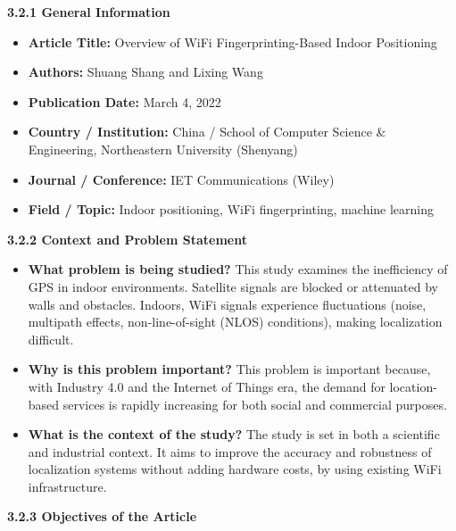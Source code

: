 \documentclass{ipgpmaster}
\begin{document}
\textbf{3.2.1   General Information}

\begin{itemize}
    \item \textbf{Article Title:} Overview of WiFi Fingerprinting-Based Indoor Positioning 
    \item \textbf{Authors:} Shuang Shang and Lixing Wang 
    \item \textbf{Publication Date:} March 4, 2022 
    \item \textbf{Country / Institution:} China / School of Computer Science \& Engineering, Northeastern University (Shenyang) 
    \item \textbf{Journal / Conference:} IET Communications (Wiley) 
    \item \textbf{Field / Topic:} Indoor positioning, WiFi fingerprinting, machine learning



\end{itemize}
 \textbf{3.2.2  Context and Problem Statement}

\begin{itemize}
    \item \textbf{What problem is being studied?}
 This study examines the inefficiency of GPS in indoor environments. Satellite signals are blocked or attenuated by walls and obstacles. Indoors, WiFi signals experience fluctuations (noise, multipath effects, non-line-of-sight (NLOS) conditions), making localization difficult. 

    \item \textbf{Why is this problem important?}
 This problem is important because, with Industry 4.0 and the Internet of Things era, the demand for location-based services is rapidly increasing for both social and commercial purposes. 

    \item \textbf{What is the context of the study?}
 The study is set in both a scientific and industrial context. It aims to improve the accuracy and robustness of localization systems without adding hardware costs, by using existing WiFi infrastructure. 

\end{itemize}
 \textbf{3.2.3  Objectives of the Article}
\end{document}
